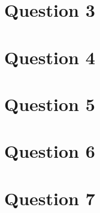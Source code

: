 \documentclass[12pt]{article}
\begin{document}
\section*{Question 3}

\section*{Question 4}

\section*{Question 5}

\section*{Question 6}

\section*{Question 7}
\end{document}
